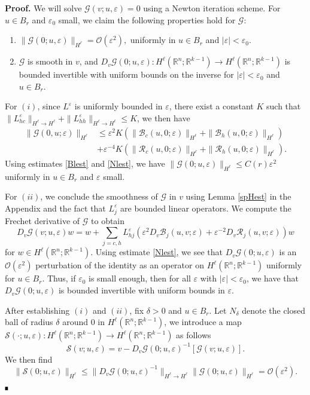 \documentclass[letterpaper,11pt]{article}
\newcommand{\R}{\mathbb{R}}
\newcommand{\rmO}{\mathcal{O}}
\newcommand{\eps}{\varepsilon}
\newcommand{\Rm}{\mathcal{R}}
\newcommand{\G}{\mathcal{G}}
\newcommand{\cS}{\mathcal{S}}
\numberwithin{equation}{section}
\theoremstyle{plain}
\theoremstyle{remark}
\newenvironment{Proof}[1][.]%
 {\begin{trivlist}\item[]\textbf{Proof#1 }}%
 {\hspace*{\fill}$\rule{0.3\baselineskip}{0.35\baselineskip}$\end{trivlist}}
\begin{document}
\begin{Proof}We will solve $\G(v;u,\eps)=0$ using a Newton iteration scheme. For $u \in B_r$ and $\eps_0$ small, we claim the following properties hold for $\G$:
\begin{enumerate}
\item $\|\G(0;u,\eps)\|_{H^\ell} = \rmO(\eps^2),$ uniformly in $u\in B_r$ and $|\eps| < \eps_0$.
\item $\G$ is smooth in $v$, and $D_v \G(0; u, \eps):H^\ell(\R^n;\R^{k-1}) \to H^\ell(\R^n;\R^{k-1})$ is bounded invertible with uniform bounds on the inverse for $|\eps|<\eps_0$ and $u \in B_r$. 
\end{enumerate}

For $(i)$, since $L^\eps$ is uniformly bounded in $\eps$, there exist a constant $K$ such that $\| L_{hc}^\eps\|_{H^\ell \to H^\ell}+\| L_{hh}^\eps \|_{H^\ell \to H^\ell } \le K$, we then have
\begin{align*}
\|\G(0,u;\eps)\|_{H^\ell} &\le \eps^2K(\|\mathcal{B}_c(u,0;\eps)\|_{H^\ell} +\|\mathcal{B}_h(u,0;\eps)\|_{H^\ell})\\
&+\eps^{-4}K(\|\Rm_c(u,0;\eps)\|_{H^\ell}+\|\Rm_h(u,0;\eps)\|_{H^\ell}).
\end{align*}
Using estimates \eqref{Blest} and \eqref{Nlest}, we have $\|\G(0;u,\eps)\|_{H^\ell} \le C(r) \eps^2$ uniformly in $u\in B_r$ and $\eps$ small.

For $(ii)$, we conclude the smoothness of $\mathcal{G}$ in $v$ using Lemma \ref{spHest} in the Appendix and the fact that $L^\eps_j$ are bounded linear operators. We compute the Frechet derivative of $\G$ to obtain
\[ 
D_v\G(v;u,\eps) w = w+ \sum_{j=c,h} L_{hj}^\eps (\eps^2 D_v \mathcal{B}_j (u,v;\eps)+ \eps^{-2} D_v\Rm_j(u,v;\eps) ) w
\] 
for $w \in H^\ell(\R^n;\R^{k-1})$. Using estimate \eqref{Nlest}, we see that $D_v\G(0; u, \eps)$ is an $\rmO(\eps^2)$ perturbation of the identity as an operator on $H^\ell(\R^n;\R^{k-1})$ uniformly for $u \in B_r$. Thus, if $\eps_0$ is small enough, then for all $\eps$ with $|\eps|<\eps_0$, we have that $D_v\G(0;u,\eps)$ is bounded invertible with uniform bounds in $\eps$.


After establishing $(i)$ and $(ii)$, fix $\delta>0$ and $u \in B_r$. Let $N_\delta$ denote the closed ball of radius $\delta$ around $0$ in $H^\ell(\R^n;\R^{k-1})$, we introduce a map $\cS(\cdot; u,\eps): H^\ell(\R^n;\R^{k-1}) \to H^\ell(\R^n;\R^{k-1})$ as follows
\[
\cS(v; u,\eps) = v - D_v\G(0;u, \eps)^{-1}[\G(v;u,\eps)].
\]
We then find
\[
\|\cS(0;u,\eps) \|_{H^\ell} \le \|D_v\G(0;u,\eps)^{-1}\|_{H^\ell\to H^\ell} \|\G(0;u, \eps)\|_{H^\ell} = \rmO(\eps^2).
\]


\end{Proof}
\end{document}
